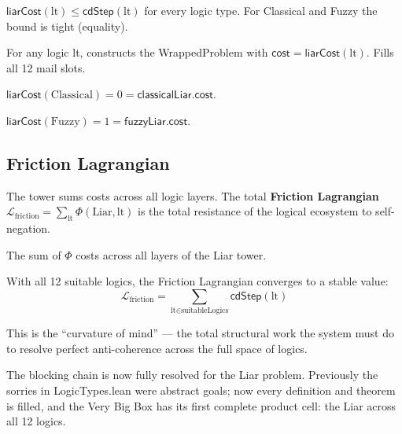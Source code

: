 \begin{theorem}
\label{thm:liar_cost_bound}
\leanok
{}
$\textsf{liarCost}(\text{lt}) \le \textsf{cdStep}(\text{lt})$ for every logic type.
For Classical and Fuzzy the bound is tight (equality).
\end{theorem}

\begin{definition}
\label{def:liar_wrapper}
\leanok
{}
For any logic \textsf{lt}, constructs the \textsf{WrappedProblem} with
$\textsf{cost} = \textsf{liarCost}(\text{lt})$. Fills all 12 mail slots.
\end{definition}

\begin{corollary}
\label{cor:liar_cost_match_classical}
\leanok
{}
$\textsf{liarCost}(\text{Classical}) = 0 = \textsf{classicalLiar.cost}$.
\end{corollary}

\begin{corollary}
\label{cor:liar_cost_match_fuzzy}
\leanok
{}
$\textsf{liarCost}(\text{Fuzzy}) = 1 = \textsf{fuzzyLiar.cost}$.
\end{corollary}

\subsection{Friction Lagrangian}

The tower sums costs across all logic layers. The total \textbf{Friction Lagrangian}
$\mathcal{L}_{\text{friction}} = \sum_{\text{lt}} \Phi(\text{Liar}, \text{lt})$ is
the total resistance of the logical ecosystem to self-negation.

\begin{definition}
\label{def:friction_lagrangian}
\leanok
{}
The sum of $\Phi$ costs across all layers of the Liar tower.
\end{definition}

With all 12 suitable logics, the Friction Lagrangian converges to a stable value:
\[
\mathcal{L}_{\text{friction}} = \sum_{\text{lt} \in \text{suitableLogics}} \textsf{cdStep}(\text{lt})
\]

This is the ``curvature of mind'' --- the total structural work the system must do
to resolve perfect anti-coherence across the full space of logics.

The blocking chain is now fully resolved for the Liar problem.
Previously the sorries in \textsf{LogicTypes.lean} were abstract goals;
now every definition and theorem is filled, and the Very Big Box has its
first complete product cell: the Liar across all 12 logics.

\endinput